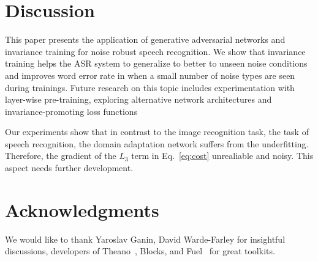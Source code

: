 \documentclass{article}
\begin{document}
\section{Discussion}
    This paper presents the application of generative adversarial networks and invariance training for noise robust speech recognition. We show that invariance training helps the ASR system to generalize to better to unseen noise
    conditions and improves word error rate in when a small number of noise types are seen during trainings. Future
    research on this topic includes experimentation with layer-wise pre-training,
    exploring alternative network architectures and invariance-promoting loss functions
        
    Our experiments show that in contrast to the image recognition task,
    the task of speech recognition,  the domain adaptation network suffers from
    the underfitting. Therefore, the gradient of the $L_3$ term in Eq.~\ref{eq:cost}
    unrealiable and noisy. This aspect needs further development.


\section*{Acknowledgments}

We would like to thank Yaroslav Ganin, David Warde-Farley for insightful discussions,
developers of Theano~\cite{2016arXiv160502688short}, Blocks, and Fuel~\cite{MerrienboerBDSW15} 
for great toolkits.

%


\end{document}
